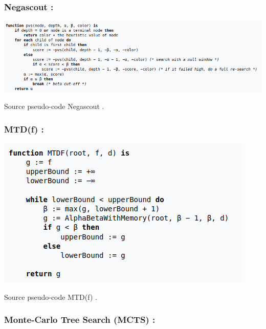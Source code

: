 \documentclass{article}
\begin{document}
\subsubsection{Negascout : }

\centerline{\includegraphics[scale = 0.5]{img/Negascout.png}}
\medskip
Source pseudo-code Negascout \cite{Negascout_pc}.
\subsubsection{MTD(f) : }

\centerline{\includegraphics[scale = 0.5]{img/MTDf.png}}
\medskip
Source pseudo-code MTD(f) \cite{MTDf_pc}.
\subsubsection{Monte-Carlo Tree Search (MCTS) : }
\end{document}

